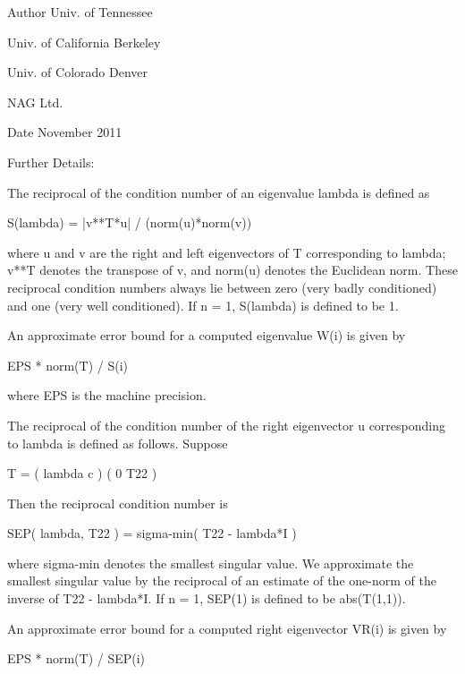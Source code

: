 \begin{DoxyAuthor}{Author}
Univ. of Tennessee 

Univ. of California Berkeley 

Univ. of Colorado Denver 

N\+A\+G Ltd. 
\end{DoxyAuthor}
\begin{DoxyDate}{Date}
November 2011 
\end{DoxyDate}
\begin{DoxyParagraph}{Further Details\+: }
\begin{DoxyVerb}  The reciprocal of the condition number of an eigenvalue lambda is
  defined as

          S(lambda) = |v**T*u| / (norm(u)*norm(v))

  where u and v are the right and left eigenvectors of T corresponding
  to lambda; v**T denotes the transpose of v, and norm(u)
  denotes the Euclidean norm. These reciprocal condition numbers always
  lie between zero (very badly conditioned) and one (very well
  conditioned). If n = 1, S(lambda) is defined to be 1.

  An approximate error bound for a computed eigenvalue W(i) is given by

                      EPS * norm(T) / S(i)

  where EPS is the machine precision.

  The reciprocal of the condition number of the right eigenvector u
  corresponding to lambda is defined as follows. Suppose

              T = ( lambda  c  )
                  (   0    T22 )

  Then the reciprocal condition number is

          SEP( lambda, T22 ) = sigma-min( T22 - lambda*I )

  where sigma-min denotes the smallest singular value. We approximate
  the smallest singular value by the reciprocal of an estimate of the
  one-norm of the inverse of T22 - lambda*I. If n = 1, SEP(1) is
  defined to be abs(T(1,1)).

  An approximate error bound for a computed right eigenvector VR(i)
  is given by

                      EPS * norm(T) / SEP(i)\end{DoxyVerb}
 
\end{DoxyParagraph}
